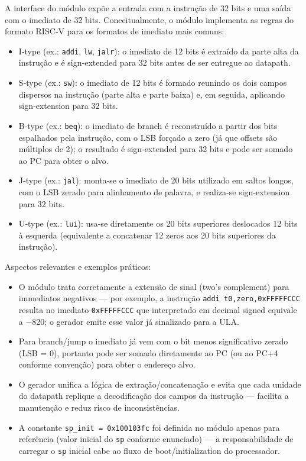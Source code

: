 \documentclass[12pt,a4paper]{article}
\begin{document}
A interface do módulo expõe a entrada com a instrução de 32 bits e uma saída com o imediato de 32 bits. Conceitualmente, o módulo implementa as regras do formato RISC‑V para os formatos de imediato mais comuns:

\begin{itemize}
    \item I‑type (ex.: \texttt{addi}, \texttt{lw}, \texttt{jalr}): o imediato de 12 bits é extraído da parte alta da instrução e é sign‑extended para 32 bits antes de ser entregue ao datapath.
    \item S‑type (ex.: \texttt{sw}): o imediato de 12 bits é formado reunindo os dois campos dispersos na instrução (parte alta e parte baixa) e, em seguida, aplicando sign‑extension para 32 bits.
    \item B‑type (ex.: \texttt{beq}): o imediato de branch é reconstruído a partir dos bits espalhados pela instrução, com o LSB forçado a zero (já que offsets são múltiplos de 2); o resultado é sign‑extended para 32 bits e pode ser somado ao PC para obter o alvo.
    \item J‑type (ex.: \texttt{jal}): monta‑se o imediato de 20 bits utilizado em saltos longos, com o LSB zerado para alinhamento de palavra, e realiza‑se sign‑extension para 32 bits.
    \item U‑type (ex.: \texttt{lui}): usa‑se diretamente os 20 bits superiores deslocados 12 bits à esquerda (equivalente a concatenar 12 zeros aos 20 bits superiores da instrução).
\end{itemize}

Aspectos relevantes e exemplos práticos:
\begin{itemize}
    \item O módulo trata corretamente a extensão de sinal (two's complement) para immediatos negativos — por exemplo, a instrução \texttt{addi t0,zero,0xFFFFFCCC} resulta no imediato \texttt{0xFFFFFCCC} que interpretado em decimal signed equivale a −820; o gerador emite esse valor já sinalizado para a ULA.
    \item Para branch/jump o imediato já vem com o bit menos significativo zerado (LSB = 0), portanto pode ser somado diretamente ao PC (ou ao PC+4 conforme convenção) para obter o endereço alvo.
    \item O gerador unifica a lógica de extração/concatenação e evita que cada unidade do datapath replique a decodificação dos campos da instrução — facilita a manutenção e reduz risco de inconsistências.
    \item A constante \texttt{sp\_init = 0x100103fc} foi definida no módulo apenas para referência (valor inicial do \texttt{sp} conforme enunciado) — a responsabilidade de carregar o \texttt{sp} inicial cabe ao fluxo de boot/initialization do processador.
\end{itemize}
\end{document}
